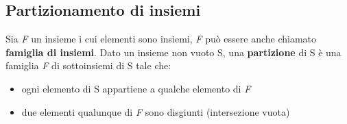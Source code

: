 \subsection{Partizionamento di insiemi}
Sia \textit{F} un insieme i cui elementi sono insiemi, \textit{F} può essere anche chiamato \textbf{famiglia di insiemi}.
Dato un insieme non vuoto S, una \textbf{partizione} di S è una famiglia \textit{F} di sottoinsiemi di S tale che:
\begin{itemize}
    \item ogni elemento di S appartiene a qualche elemento di \textit{F}
    \item due elementi qualunque di \textit{F} sono disgiunti (intersezione vuota)
\end{itemize}